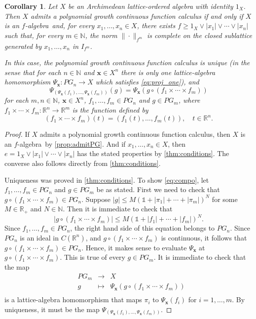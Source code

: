 \documentclass[10pt,a4paper]{amsart}
\newcommand\N{\ensuremath{\mathbb{N}}}
\newcommand{\Psx}{\Psi_{\bm x}}
\newcommand\R{\ensuremath{\mathbb{R}}}
\newcommand{\falg}{$f\!$-algebra}
\newcommand{\one}{\mathbb{1}}
\theoremstyle{plain}
\newtheorem{cor}[thm]{Corollary}
\theoremstyle{definition}
\theoremstyle{remark}
\begin{document}
\begin{cor}\label{cor:conditions}
    Let $X$ be an Archimedean lattice-ordered algebra with identity
    $1_X$. Then
    $X$ admits a polynomial growth continuous function calculus if and
    only if $X$ is an \falg\ and, for every $x_1,\ldots ,x_n \in X$,
    there exists $f\ge 1_X\vee |x_1|\vee \cdots
    \vee |x_n|$ such that, for every $m \in \N$, the norm
    $\|{\cdot }\|_{f^{m}}$ is complete on the closed sublattice
    generated by $x_1,\ldots ,x_n$ in $I_{f^{m}}$.

    In this case, the polynomial growth continuous function calculus
    is unique (in the sense that for each $n \in \N$ and $\bm x \in
    X^{n}$ there is only one lattice-algebra homomorphism $\Psx\colon
    PG_n\to X$ which satisfies \eqref{eq:proj_one}), and
    \begin{equation}\label{eq:compo}
        \Psi _{(\Psi _{\bm x}(f_1),\ldots ,\Psi _{\bm x}(f_m))}(g)=\Psi
        _{\bm x}(g\circ (f_1\times \cdots \times f_m))
    \end{equation}
    for each $m,n \in \N$, $\bm x \in X^{n}$, $f_1,\ldots ,f_m \in
    PG_n$ and $g \in PG_{m}$, where $f_1\times \cdots \times f_m\colon
    \R^{n}\to \R^{m}$ is the function defined by
    \[
        (f_1\times \cdots \times f_m)(t)=(f_1(t),\ldots ,f_m(t)),\quad
        t \in \R^{n}.
    \]
\end{cor}

\begin{proof}
    If $X$ admits a polynomial growth continuous function calculus,
    then $X$ is an \falg\ by \cref{prop:admitPG}. And if $x_1,\ldots ,x_n \in X$, then
    $e=1_X\vee|x_1|\vee \cdots \vee |x_n| $ has the stated properties
    by \cref{thm:conditions}. The converse also follows directly from \cref{thm:conditions}.

    Uniqueness was proved in \cref{thm:conditions}. To show
    \eqref{eq:compo}, let $f_1,\ldots ,f_m \in PG_n$ and $g \in PG_m$
    be as stated. First we need to check that $g\circ (f_1\times
    \cdots \times f_m) \in PG_n$. Suppose $|g|\le M (\one + |\pi _1| + \cdots +
    |\pi _m|)^{N}$ for some $M\in \R_+$ and $N \in \N$. Then it is immediate
    to check that
    \[
    |g\circ (f_1\times \cdots \times f_m)|\le M(\one + |f_1| + \cdots
    + |f_m|)^{N}.
    \]
    Since $f_1,\ldots ,f_m \in PG_n$, the right hand side of this
    equation belongs to $PG_n$. Since $PG_n$ is an ideal in
    $C(\R^{n})$, and $g\circ (f_1\times \cdots \times f_m)$ is
    continuous, it follows that $g\circ (f_1\times \cdots \times f_m)
    \in PG_n$. Hence, it makes sense to evaluate $\Psx$ at $g\circ (f_1\times
    \cdots \times f_m)$. This is true of every $g \in PG_m$.
    It is immediate to check that the map
    \[
    \begin{array}{cccc}
            & PG_m & \longrightarrow & X \\
            & g & \longmapsto & \Psx(g\circ (f_1\times \cdots \times
            f_m)) \\
    \end{array}
    \]
    is a lattice-algebra homomorphism that maps $\pi _i$ to $\Psx
    (f_i)$ for $i=1,\ldots ,m$. By uniqueness, it must be the map $\Psi
    _{(\Psx(f_1),\ldots ,\Psx(f_m))}$.
\end{proof}
\end{document}
